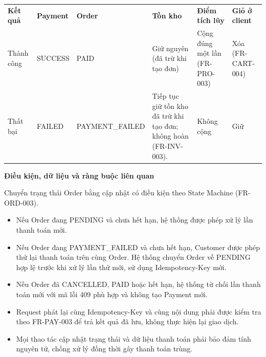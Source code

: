 \documentclass[11pt,a4paper,oneside]{report}
\begin{document}
\begin{longtable}[]{@{}
  >{\raggedright\arraybackslash}p{}
  >{\raggedright\arraybackslash}p{}
  >{\raggedright\arraybackslash}p{}
  >{\raggedright\arraybackslash}p{}
  >{\raggedright\arraybackslash}p{}
  >{\raggedright\arraybackslash}p{}@{}}
\toprule\noalign{}
\endhead
\bottomrule\noalign{}
\endlastfoot
\textbf{Kết quả} & \textbf{Payment} & \textbf{Order} & \textbf{Tồn kho} & \textbf{Điểm tích lũy} & \textbf{Giỏ ở client} \\
Thành công & SUCCESS & PAID & Giữ nguyên (đã trừ khi tạo đơn) & Cộng đúng một lần (FR-PRO-003) & Xóa (FR-CART-004) \\
Thất bại & FAILED & PAYMENT\_FAILED & Tiếp tục giữ tồn kho đã trừ khi tạo đơn; không hoàn (FR-INV-003). & Không cộng & Giữ \\
\end{longtable}

\textbf{Điều kiện, dữ liệu và ràng buộc liên quan}

Chuyển trạng thái Order bằng cập nhật có điều kiện theo State Machine (FR-ORD-003).

\begin{itemize}
\item
  Nếu Order đang PENDING và chưa hết hạn, hệ thống được phép xử lý lần thanh toán mới.
\item
  Nếu Order đang PAYMENT\_FAILED và chưa hết hạn, Customer được phép thử lại thanh toán trên cùng Order. Hệ thống chuyển Order về PENDING hợp lệ trước khi xử lý lần thử mới, sử dụng Idempotency-Key mới.
\item
  Nếu Order đã CANCELLED, PAID hoặc hết hạn, hệ thống từ chối lần thanh toán mới với mã lỗi 409 phù hợp và không tạo Payment mới.
\item
  Request phát lại cùng Idempotency-Key và cùng nội dung phải được kiểm tra theo FR-PAY-003 để trả kết quả đã lưu, không thực hiện lại giao dịch.
\item
  Mọi thao tác cập nhật trạng thái và dữ liệu thanh toán phải bảo đảm tính nguyên tử, chống xử lý đồng thời gây thanh toán trùng.
\end{itemize}
\end{document}
